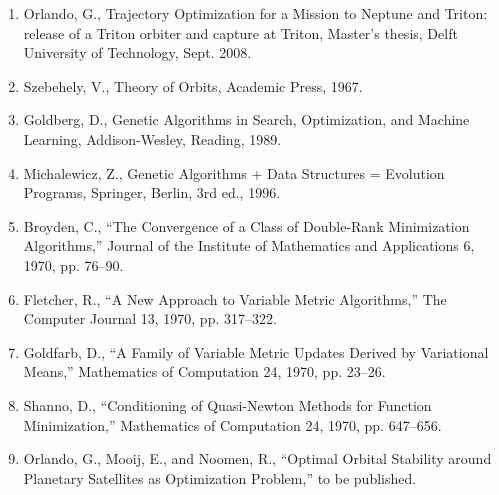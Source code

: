 \documentclass[12pt]{article}
\begin{document}
\begin{enumerate}
\item Orlando, G., Trajectory Optimization for a Mission to Neptune and Triton: release of a Triton orbiter and capture at Triton, Master’s thesis, Delft University of Technology, Sept. 2008.
\item Szebehely, V., Theory of Orbits, Academic Press, 1967.
\item Goldberg, D., Genetic Algorithms in Search, Optimization, and Machine Learning, Addison-Wesley, Reading, 1989.
\item Michalewicz, Z., Genetic Algorithms + Data Structures = Evolution Programs, Springer, Berlin, 3rd ed., 1996.
\item Broyden, C., ``The Convergence of a Class of Double-Rank Minimization Algorithms,'' Journal of the Institute of Mathematics and Applications 6, 1970, pp. 76--90.
\item Fletcher, R., ``A New Approach to Variable Metric Algorithms,'' The Computer Journal 13, 1970, pp. 317--322.
\item Goldfarb, D., ``A Family of Variable Metric Updates Derived by Variational Means,'' Mathematics of Computation 24, 1970, pp. 23--26.
\item Shanno, D., ``Conditioning of Quasi-Newton Methods for Function Minimization,'' Mathematics of Computation 24, 1970, pp. 647--656.
\item Orlando, G., Mooij, E., and Noomen, R., ``Optimal Orbital Stability around Planetary Satellites as Optimization Problem,'' to be published.
\end{enumerate}
\end{document}
